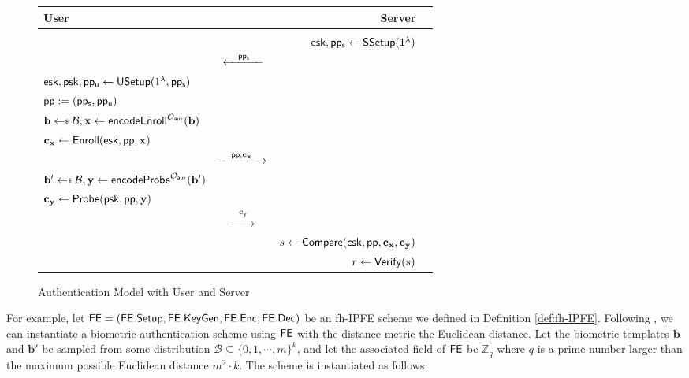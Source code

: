 \begin{figure}[]
	\begin{center}
		\begin{tabular}{l c r c}
			{\bf User} &	& {\bf Server} \\

			\hline

			\\

			&	& ${\sf csk}, {\sf pp_s} \gets {\sf SSetup(1^\lambda)}$ \\

			&	$\xleftarrow{\quad {\sf pp_s} \quad}$ \\

			${\sf esk}, {\sf psk}, {\sf pp_u} \gets {\sf USetup}(1^\lambda, {\sf pp_s})$ \\

			${\sf pp}:= ({\sf pp_s}, {\sf pp_u})$ \\

			$ \mathbf{b} \getsdollar \mathcal{B}, \mathbf{x} \gets {\sf encodeEnroll}^{\mathcal{O}_{\sf aux}}(\mathbf{b})$ \\

			$\mathbf{c_x} \gets {\sf Enroll}({\sf esk}, {\sf pp}, \mathbf{x})$ \\

			& $\xrightarrow{\quad {\sf pp}, \mathbf{c_x} \quad}$ \\

			$ \mathbf{b'} \getsdollar \mathcal{B}, \mathbf{y} \gets {\sf encodeProbe}^{\mathcal{O}_{\sf aux}}(\mathbf{b'})$ \\

			$\mathbf{c_y} \gets {\sf Probe}({\sf psk}, {\sf pp}, \mathbf{y})$ \\

			& $\xrightarrow{\quad \mathbf{c_y} \quad}$ \\
			
			&  & $s \gets {\sf Compare} ({\sf csk}, {\sf pp}, \mathbf{c_x}, \mathbf{c_y})$ \\

			& & $r \gets {\sf Verify}(s) $ \\
		\end{tabular}
	\end{center}
	\caption{Authentication Model with User and Server}
	\label{table:model}
\end{figure}


For example, let ${\sf FE} = ({\sf FE.Setup}, {\sf FE.KeyGen}, {\sf FE.Enc}, {\sf FE.Dec})$ be an fh-IPFE scheme we defined in Definition \ref{def:fh-IPFE}. Following \cite{cryptoeprint:2023/481}, we can instantiate a biometric authentication scheme using ${\sf FE}$ with the distance metric the Euclidean distance. Let the biometric templates $\mathbf{b}$ and $\mathbf{b'}$ be sampled from some distribution $\mathcal{B} \subseteq \{0,1,\cdots, m\}^k$, and let the associated field of ${\sf FE}$ be $\mathbb{Z}_q$ where $q$ is a prime number larger than the maximum possible Euclidean distance $m^2 \cdot k$. The scheme is instantiated as follows.


